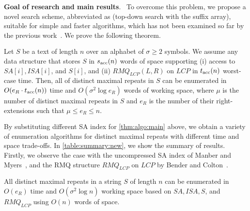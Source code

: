 \textbf{Goal of research and main results}.\ 
To overcome this problem, we propose a novel search scheme, abbreviated as \TDSA{} (top-down search with the suffix array), suitable for simple and faster algorithms, which has not been examined so far by the previous work~\cite{narisawa2007efficient,beller:berger2012space:efficient:bbo,belazzougui2020linear,nishimoto:cpm2021enum}.  
We prove the following theorem.


\begin{theorem}\label{thm:algo:main}
  Let $S$ be a text of length $n$ over an alphabet of $\sigma\ge 2$ symbols.
  We assume any data structure that stores $S$ in $s_{\mathrm{acc}}(n)$ words of space supporting (i) access to $SA[i], ISA[i]$, and $S[i]$, and (ii) $RMQ_{LCP}(L, R)$ on $LCP$ in $t_{\mathrm{acc}}(n)$ worst-case time.
Then, all of distinct maximal repeats in $S$ can be enumerated in $O(e_R\cdot t_{\mathrm{acc}}(n))$ time and $O(\sigma^2 \log e_R)$ words of working space, where $\mu$ is the number of distinct maximal repeats in $S$ and  $e_R$ is the number of their right-extensions such that $\mu \le e_R \le n$. 
\end{theorem}

By substituting different SA index for \cref{thm:algo:main} above, we obtain a variety of enumeration algorithms for distinct maximal repeats with different time and space trade-offs.
In \cref{table:summary:new}, we show the summary of results. 
Firstly, we observe the case with the uncompressed SA index of Manber and Myers~\cite{manber:myers1993suffixarrays}, and the RMQ structure $RMQ_{LCP}$ on $LCP$ by Bender and Colton~\cite{bender:colton2000thelcaproblem}. 

\begin{theorem}\label{thm:algo:uncompressed:sa}
  All distinct maximal repeats in a string $S$ of length $n$ can be enumerated in $O(e_R)$ time and $O(\sigma^2 \log n)$ working space based on $SA, ISA, S$, and $RMQ_{LCP}$ using $O(n)$ words of space. 
\end{theorem}

